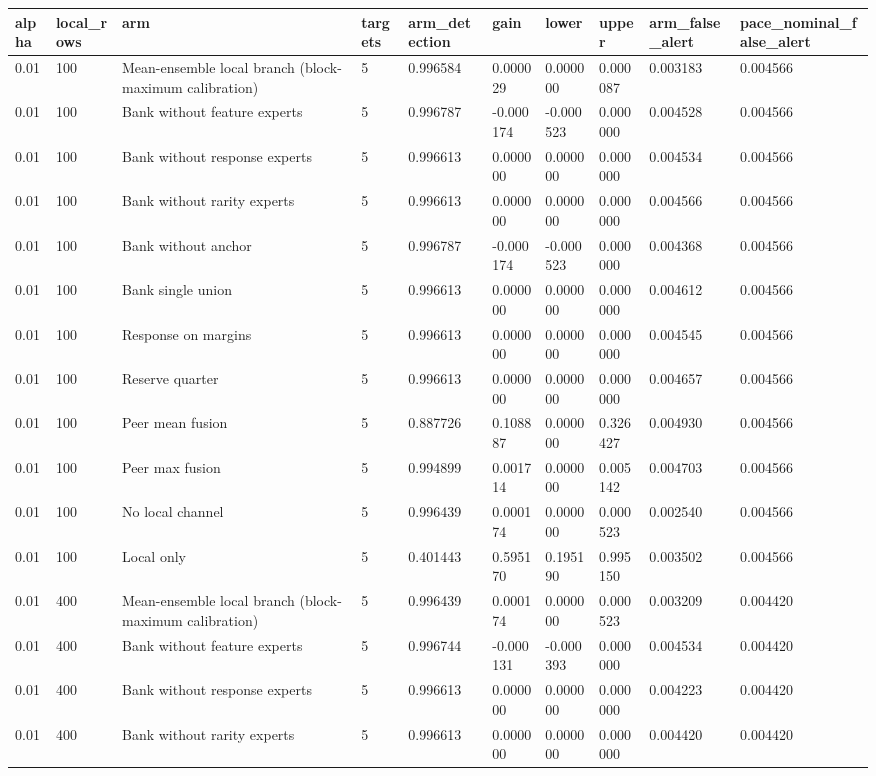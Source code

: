 \begin{tabular}{llllllllll}
\toprule
alpha & local\_rows & arm & targets & arm\_detection & gain & lower & upper & arm\_false\_alert & pace\_nominal\_false\_alert \\
\midrule
0.01 & 100 & Mean-ensemble local branch (block-maximum calibration) & 5 & 0.996584 & 0.000029 & 0.000000 & 0.000087 & 0.003183 & 0.004566 \\
0.01 & 100 & Bank without feature experts & 5 & 0.996787 & -0.000174 & -0.000523 & 0.000000 & 0.004528 & 0.004566 \\
0.01 & 100 & Bank without response experts & 5 & 0.996613 & 0.000000 & 0.000000 & 0.000000 & 0.004534 & 0.004566 \\
0.01 & 100 & Bank without rarity experts & 5 & 0.996613 & 0.000000 & 0.000000 & 0.000000 & 0.004566 & 0.004566 \\
0.01 & 100 & Bank without anchor & 5 & 0.996787 & -0.000174 & -0.000523 & 0.000000 & 0.004368 & 0.004566 \\
0.01 & 100 & Bank single union & 5 & 0.996613 & 0.000000 & 0.000000 & 0.000000 & 0.004612 & 0.004566 \\
0.01 & 100 & Response on margins & 5 & 0.996613 & 0.000000 & 0.000000 & 0.000000 & 0.004545 & 0.004566 \\
0.01 & 100 & Reserve quarter & 5 & 0.996613 & 0.000000 & 0.000000 & 0.000000 & 0.004657 & 0.004566 \\
0.01 & 100 & Peer mean fusion & 5 & 0.887726 & 0.108887 & 0.000000 & 0.326427 & 0.004930 & 0.004566 \\
0.01 & 100 & Peer max fusion & 5 & 0.994899 & 0.001714 & 0.000000 & 0.005142 & 0.004703 & 0.004566 \\
0.01 & 100 & No local channel & 5 & 0.996439 & 0.000174 & 0.000000 & 0.000523 & 0.002540 & 0.004566 \\
0.01 & 100 & Local only & 5 & 0.401443 & 0.595170 & 0.195190 & 0.995150 & 0.003502 & 0.004566 \\
0.01 & 400 & Mean-ensemble local branch (block-maximum calibration) & 5 & 0.996439 & 0.000174 & 0.000000 & 0.000523 & 0.003209 & 0.004420 \\
0.01 & 400 & Bank without feature experts & 5 & 0.996744 & -0.000131 & -0.000393 & 0.000000 & 0.004534 & 0.004420 \\
0.01 & 400 & Bank without response experts & 5 & 0.996613 & 0.000000 & 0.000000 & 0.000000 & 0.004223 & 0.004420 \\
0.01 & 400 & Bank without rarity experts & 5 & 0.996613 & 0.000000 & 0.000000 & 0.000000 & 0.004420 & 0.004420 \\

\end{tabular}
